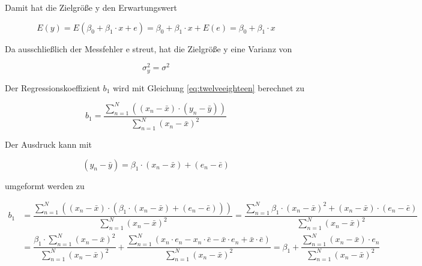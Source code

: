 \noindent Damit hat die Zielgr\"{o}{\ss}e y den Erwartungswert 

\begin{equation}\label{eq:twelvetwentyseven}
E(y)=E(\beta _{0} +\beta _{1} \cdot x+e)=\beta _{0} +\beta _{1} \cdot x+E(e)=\beta _{0} +\beta _{1} \cdot x
\end{equation}

\noindent Da ausschlie{\ss}lich der Messfehler e streut, hat die Zielgr\"{o}{\ss}e y eine Varianz von 

\begin{equation}\label{eq:twelvetwentyeight}
\sigma _{y}^{2} =\sigma ^{2}
\end{equation}

\noindent Der Regressionskoeffizient $b_{1}$ wird mit Gleichung \eqref{eq:twelveeighteen} berechnet zu

\begin{equation}\label{eq:twelvetwentynine}
b_{1} =\dfrac{\sum\limits _{n=1}^{N}\left((x_{n} -\bar{x})\cdot (y_{n} -\bar{y})\right) }{\sum\limits _{n=1}^{N}(x_{n} -\bar{x})^{2}}
\end{equation}

\noindent Der Ausdruck kann mit

\begin{equation}\label{eq:twelvethirty}
(y_{n} -\bar{y})=\beta _{1} \cdot (x_{n} -\bar{x})+(e_{n} -\bar{e})
\end{equation}

\noindent umgeformt werden zu

\begin{equation}\label{eq:twelvethirtyone}
\begin{split}
b_{1} & = \dfrac{\sum\limits _{n=1}^{N}\left((x_{n} -\bar{x})\cdot \left(\beta _{1} \cdot (x_{n} -\bar{x})+(e_{n} -\bar{e})\right)\right) }{\sum\limits  _{n=1}^{N}\left(x_{n} -\bar{x}\right)^{2}} =\dfrac{\sum\limits  _{n=1}^{N}\beta _{1} \cdot \left(x_{n} -\bar{x}\right)^{2} +(x_{n} -\bar{x})\cdot (e_{n} -\bar{e}) }{\sum\limits  _{n=1}^{N}(x_{n} -\bar{x})^{2}}\\
& =\dfrac{\beta _{1} \cdot\sum\limits  _{n=1}^{N} \left(x_{n} -\bar{x}\right)^{2}}{\sum\limits  _{n=1}^{N}(x_{n} -\bar{x})^{2}} +\dfrac{\sum\limits  _{n=1}^{N}(x_{n}\cdot e_{n}-x_{n}\cdot \bar{e}-\bar{x}\cdot e_{n}+\bar{x}\cdot \bar{e})}{\sum\limits  _{n=1}^{N}\left(x_{n} -\bar{x}\right)^{2}} = \beta _{1} + \dfrac{\sum\limits  _{n=1}^{N} \left(x_{n} -\bar{x}\right)\cdot e_{n}}{\sum\limits  _{n=1}^{N}(x_{n} -\bar{x})^{2}} 
\end{split}
\end{equation}

